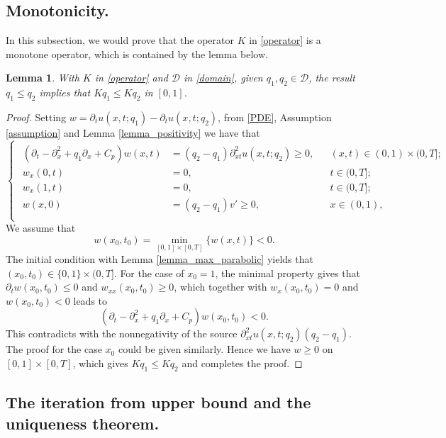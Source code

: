 \documentclass[11pt]{article}
\newtheorem{lemma}{Lemma}[section]
\numberwithin{equation}{section}
\begin{document}
\subsection{Monotonicity.}
In this subsection, we would prove that the operator $K$ in \eqref{operator} is a monotone operator, which is contained by the lemma below. 
\begin{lemma}\label{lemma_monotone}
 With $K$ in \eqref{operator} and $\mathcal D$ in \eqref{domain}, given $q_1, q_2\in \mathcal D$, the result $q_1\le q_2$  implies that $Kq_1\le Kq_2$ in $[0,1]$.
\end{lemma}
\begin{proof}
 Setting $w=\partial_tu(x,t;q_1)-\partial_tu(x,t;q_2)$, from \eqref{PDE}, Assumption \ref{assumption} and Lemma \ref{lemma_positivity} we have that 
 \begin{equation*}
 \begin{cases}
  \begin{aligned}
   (\partial_t-\partial_x^2+q_1\partial_x+C_p)w(x,t)
   &=(q_2-q_1)\partial_{xt}^2 u(x,t;q_2)\ge0, &&(x,t)\in(0,1)\times(0,T];\\
   w_x(0,t)&=0,&&t\in(0,T];\\
   w_x(1,t)&=0,&&t\in(0,T];\\
   w(x,0)&= (q_2-q_1)v'\ge 0,&&x\in(0,1),\\
  \end{aligned}
 \end{cases}
\end{equation*}
We assume that 
$$w(x_0,t_0)=\min_{[0,1]\times[0,T]}\{ w(x,t)\}<0.$$
The initial condition with Lemma \ref{lemma_max_parabolic} yields that $(x_0,t_0)\in \{0,1\}\times(0,T]$. For the case of $x_0=1$, the minimal property gives that 
$\partial_tw(x_0,t_0)\le 0$ and $w_{xx}(x_0,t_0)\ge 0$, which together with $w_x(x_0,t_0)=0$ and $w(x_0,t_0)<0$ leads to 
$$(\partial_t-\partial_x^2+q_1\partial_x+C_p)w(x_0,t_0)<0.$$ 
This contradicts with the nonnegativity of the source $\partial_{xt}^2 u(x,t;q_2)(q_2-q_1)$. The proof for the case $x_0$ could be given similarly. Hence we have $w\ge 0$ on $[0,1]\times[0,T]$, which gives $Kq_1\le Kq_2$ and completes the proof.  
\end{proof}


\subsection{The iteration from upper bound and the uniqueness theorem.}
\end{document}
